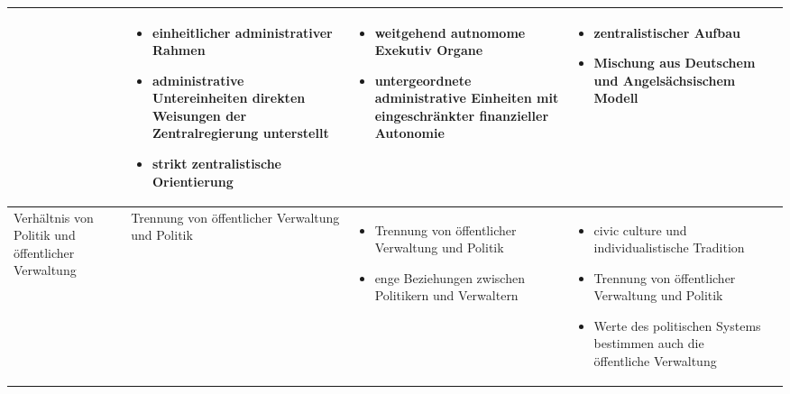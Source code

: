 \begin{landscape}
\begin{table}[!hbt]
\begin{tabular}{|p{4cm}|p{5cm}|p{5cm}|p{5cm}|p{4cm}|}
&
\begin{itemize}[leftmargin=*]
\item einheitlicher administrativer Rahmen
\item administrative Untereinheiten direkten Weisungen der Zentralregierung unterstellt
\item strikt zentralistische Orientierung
\end{itemize}
&
\begin{itemize}[leftmargin=*]
\item weitgehend autnomome Exekutiv Organe
\item untergeordnete administrative Einheiten mit eingeschränkter finanzieller Autonomie           
\end{itemize}
&
\begin{itemize}[leftmargin=*]
\item zentralistischer Aufbau
\item Mischung aus Deutschem und Angelsächsischem Modell
\end{itemize}\\\hline
Verhältnis von Politik und öffentlicher Verwaltung&	Trennung von öffentlicher Verwaltung und Politik&
\begin{itemize}[leftmargin=*]
\item Trennung von öffentlicher Verwaltung und Politik
\item enge Beziehungen zwischen Politikern und Verwaltern
\end{itemize}
&
 \vspace{-3mm}
\begin{itemize}[leftmargin=*]
\item civic culture und individualistische Tradition
\item Trennung von öffentlicher Verwaltung und Politik
\item Werte des politischen Systems bestimmen auch die öffentliche Verwaltung
 \vspace{-3mm}
 \end{itemize}


\end{tabular}
\end{table}
\end{landscape}

